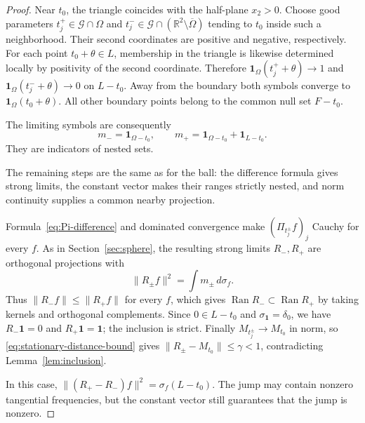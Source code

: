 \documentclass[a4paper,12pt,reqno]{amsart}
\newcommand{\lead}[1]{\par\smallskip\noindent\leavevmode#1\par\smallskip}
\theoremstyle{remark}
\numberwithin{equation}{section}
\newcommand{\R}{\mathbb R}
\newcommand{\one}{\mathbf 1}
\DeclareMathOperator{\Ran}{Ran}
\begin{document}
\begin{proof}
Near $t_0$, the triangle coincides with the half-plane $x_2>0$.
Choose good parameters $t_j^+\in\mathcal G\cap\Omega$ and
$t_j^-\in\mathcal G\cap(\R^2\setminus\overline\Omega)$ tending to
$t_0$ inside such a neighborhood. Their second coordinates are positive
and negative, respectively. For each point $t_0+\theta\in L$, membership
in the triangle is likewise determined locally by positivity of the second
coordinate. Therefore
$\one_\Omega(t_j^++\theta)\to1$ and
$\one_\Omega(t_j^-+\theta)\to0$ on $L-t_0$.
Away from the boundary both symbols converge to
$\one_\Omega(t_0+\theta)$. All other boundary points belong to the
common null set $F-t_0$.

The limiting symbols are consequently
\[
 m_-=\one_{\Omega-t_0},\qquad
 m_+=\one_{\Omega-t_0}+\one_{L-t_0}.
\]
They are indicators of nested sets.


\lead{The remaining steps are the same as for the ball: the difference
formula gives strong limits, the constant vector makes their ranges
strictly nested, and norm continuity supplies a common nearby projection.}


Formula~\eqref{eq:Pi-difference}
and dominated convergence make $(\Pi_{t_j^\pm}f)_j$ Cauchy for every
$f$. As in Section~\ref{sec:sphere}, the resulting strong limits
$R_-,R_+$ are orthogonal projections with
\[
 \|R_\pm f\|^2=\int m_\pm\,d\sigma_f.
\]
Thus $\|R_-f\|\leq\|R_+f\|$ for every $f$, which gives
$\Ran R_-\subset\Ran R_+$ by taking kernels and orthogonal complements.
Since $0\in L-t_0$ and $\sigma_{\one}=\delta_0$, we have
$R_-\one=0$ and $R_+\one=\one$; the inclusion is strict.
Finally $M_{t_j^\pm}\to M_{t_0}$ in norm, so
\eqref{eq:stationary-distance-bound} gives
$\|R_\pm-M_{t_0}\|\leq\gamma<1$, contradicting
Lemma~\ref{lem:inclusion}.

In this case, $\|(R_+-R_-)f\|^2=\sigma_f(L-t_0)$. The jump may
contain nonzero tangential frequencies, but the constant vector still
guarantees that the jump is nonzero.
\end{proof}
\end{document}
